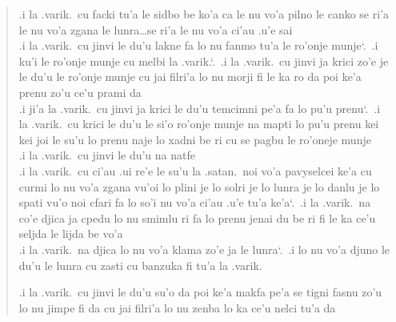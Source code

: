 \documentclass{report}
\newcommand\sds{\spacefactor\sfcode`.\ \space}
\begin{document}
\begin{quote}
	.i la .varik.\ cu facki tu'a le sidbo be ko'a ca le nu vo'a pilno le canko se ri'a le nu vo'a zgana le lunra\ldots se ri'a le nu vo'a ci'au .u'e sai\\
	.i la .varik.\ cu jinvi le du'u lakne fa lo nu fanmo tu'a le ro'onje munje\sds  .i ku'i le ro'onje munje cu melbi la .varik.\sds  .i la .varik.\ cu jinvi ja krici zo'e je le du'u le ro'onje munje cu jai filri'a lo nu morji fi le ka ro da poi ke'a prenu zo'u ce'u prami da\\
	.i ji'a la .varik.\ cu jinvi ja krici le du'u temcimni pe'a fa lo pu'u prenu\sds  .i la .varik.\ cu krici le du'u le si'o ro'onje munje na mapti lo pu'u prenu kei kei joi le su'u lo prenu naje lo xadni be ri cu se pagbu le ro'oneje munje\\
	.i la .varik.\ cu jinvi le du'u na natfe\\
	.i la .varik.\ cu ci'au .ui re'e le su'u la .satan.\ noi vo'a pavyselcei ke'a cu curmi lo nu vo'a zgana vu'oi lo plini je lo solri je lo lunra je lo danlu je lo spati vu'o noi cfari fa lo so'i nu vo'a ci'au .u'e tu'a ke'a\sds  .i la .varik.\ na co'e djica ja cpedu lo nu smimlu ri fa lo prenu jenai du be ri fi le ka ce'u seljda le lijda be vo'a\\
	.i la .varik.\ na djica lo nu vo'a klama zo'e ja le lunra\sds  .i lo nu vo'a djuno le du'u le lunra cu zasti cu banzuka fi tu'a la .varik.

	.i la .varik.\ cu jinvi le du'u su'o da poi ke'a makfa pe'a se tigni fasnu zo'u lo nu jimpe fi da cu jai filri'a lo nu zenba lo ka ce'u nelci tu'a da


\end{quote}
\end{document}
